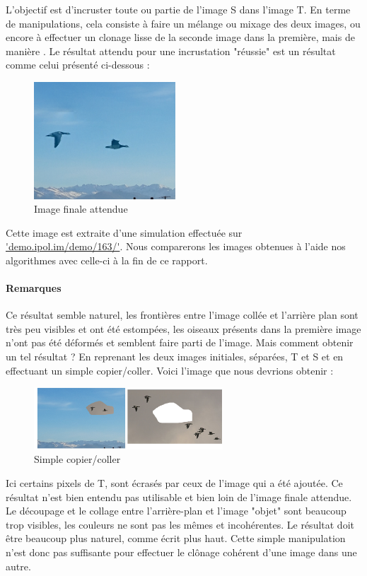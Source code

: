 L'objectif est d'incruster toute ou partie de l'image S dans l'image T. En terme de manipulations, cela consiste à faire un mélange ou mixage des deux images, ou encore à effectuer un clonage lisse de la seconde image dans la première, mais de manière .
Le résultat attendu pour une incrustation "réussie" est un résultat comme celui présenté ci-dessous : 
    
\begin{center}
\begin{figure}[!htb]
   \centering
     \includegraphics[width = 150pt]{Images/clonage_done.png}
     \caption{Image  finale attendue}
\end{figure}
\end{center}
Cette image est extraite d'une simulation effectuée sur \url{'demo.ipol.im/demo/163/'}. Nous comparerons les images obtenues à l'aide nos algorithmes avec celle-ci à la fin de ce rapport.\newline
\paragraph{Remarques}
Ce résultat semble naturel, les frontières entre l'image collée et l'arrière plan sont très peu visibles et ont été estompées, les oiseaux présents dans la première image n'ont pas été déformés et semblent faire parti de l'image. 
Mais comment obtenir un tel résultat ?
\newline
En reprenant les deux images initiales, séparées, T et S et en effectuant un simple copier/coller. Voici l'image que nous devrions obtenir : 
\begin{center}
\begin{figure}[H]
     \centering
     \includegraphics[width = 200pt]{Images/collage1.jpg}
     \caption{Simple copier/coller}
\end{figure}
\end{center}
Ici certains pixels de T, sont écrasés par ceux de l'image qui a été ajoutée. Ce résultat n'est bien entendu pas utilisable et bien loin de l'image finale attendue. Le découpage et le collage entre l'arrière-plan et l'image "objet" sont beaucoup trop visibles, les couleurs ne sont pas les mêmes et incohérentes. Le résultat doit être beaucoup plus naturel, comme écrit plus haut. Cette simple manipulation n'est donc pas suffisante pour effectuer le clônage cohérent  d'une image dans une autre. \newline


